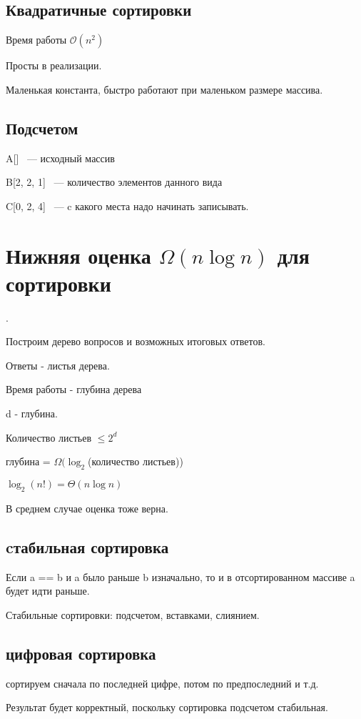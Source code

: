 \documentclass[12pt]{article}
\def\O{\mathcal{O}}
\begin{document}
\subsection{Квадратичные сортировки}

Время работы $\O(n^2)$

Просты в реализации.

Маленькая константа, быстро работают при маленьком размере массива. 

\subsection{Подсчетом}
A[] ~--- исходный массив

B[2, 2, 1] ~--- количество элементов данного вида

C[0, 2, 4] ~--- c какого места надо начинать записывать.

\section{Нижняя оценка $\Omega(n\log n)$ для сортировки}.

Построим дерево вопросов и возможных итоговых ответов.

Ответы - листья дерева.

Время работы - глубина дерева

d - глубина.

Количество листьев $\le 2^d$

глубина = $\Omega(\log_2$(количество листьев))

$\log_2(n!) = \Theta(n\log n)$

В среднем случае оценка тоже верна.

\subsection{cтабильная сортировка}

Если a == b  и a было раньше b изначально, то и в отсортированном массиве a будет идти раньше.

Стабильные сортировки: подсчетом, вставками, слиянием.

\subsection{цифровая сортировка}

сортируем сначала по последней цифре, потом по предпоследний и т.д.

Результат будет корректный, поскольку сортировка подсчетом стабильная. 
\end{document}
